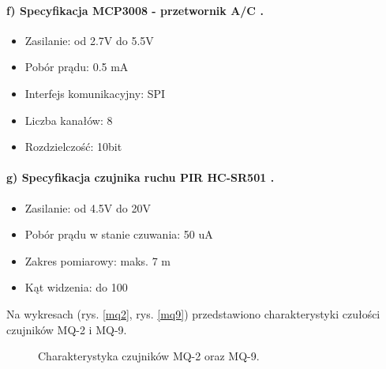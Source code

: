 \paragraph{f) Specyfikacja MCP3008 - przetwornik A/C \protect\cite{specyfikacjaAC}.}
\begin{itemize} 
\item Zasilanie: od 2.7V do 5.5V
\item Pobór prądu: 0.5 mA
\item Interfejs komunikacyjny: SPI
\item Liczba kanałów: 8
\item Rozdzielczość: 10bit
\end{itemize}
\paragraph{g) Specyfikacja czujnika ruchu PIR HC-SR501 \protect\cite{pir}.}
\begin{itemize} 
\item Zasilanie: od 4.5V do 20V
\item Pobór prądu w stanie czuwania: 50 uA
\item Zakres pomiarowy: maks. 7 m
\item Kąt widzenia: do 100\textdegree{}
\end{itemize}
Na wykresach (rys. \ref{mq2}, rys. \ref{mq9}) przedstawiono charakterystyki czułości czujników MQ-2 i MQ-9.
\begin{figure}[ht]
	\centering
	\hfill
	\caption{Charakterystyka czujników MQ-2 oraz MQ-9.}
	\label{mq2_mq9}
\end{figure}
